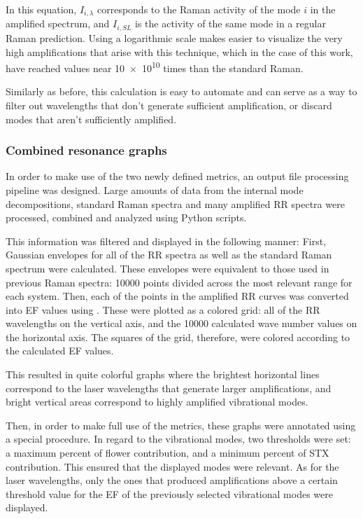 In this equation, $I_{i,\lambda}$ corresponds to the Raman activity of the mode $i$ in the amplified spectrum, and $I_{i,\textit{SL}}$ is the activity of the same mode in a regular Raman prediction.
Using a logarithmic scale makes easier to visualize the very high amplifications that arise with this technique, which in the case of this work, have reached values near \num{10e10} times than the standard Raman.

Similarly as before, this calculation is easy to automate and can serve as a way to filter out wavelengths that don't generate sufficient amplification, or discard modes that aren't sufficiently amplified.

\subsubsection{Combined resonance graphs}
In order to make use of the two newly defined metrics, an output file processing pipeline was designed.
Large amounts of data from the internal mode decompositions, standard Raman spectra and many amplified RR spectra were processed, combined and analyzed using Python scripts.

This information was filtered and displayed in the following manner:
First, Gaussian envelopes for all of the RR spectra as well as the standard Raman spectrum were calculated.
These envelopes were equivalent to those used in previous Raman spectra: \num{10000} points divided across the most relevant range for each system.
Then, each of the points in the amplified RR curves was converted into EF values using .
These were plotted as a colored grid: all of the RR wavelengths on the vertical axis, and the \num{10000} calculated wave number values on the horizontal axis.
The squares of the grid, therefore, were colored according to the calculated EF values.

This resulted in quite colorful graphs where the brightest horizontal lines correspond to the laser wavelengths that generate larger amplifications, and bright vertical areas correspond to highly amplified vibrational modes.

Then, in order to make full use of the metrics, these graphs were annotated using a special procedure.
In regard to the vibrational modes, two thresholds were set: a maximum percent of flower contribution, and a minimum percent of STX contribution.
This ensured that the displayed modes were relevant.
As for the laser wavelengths, only the ones that produced amplifications above a certain threshold value for the EF of the previously selected vibrational modes were displayed.

